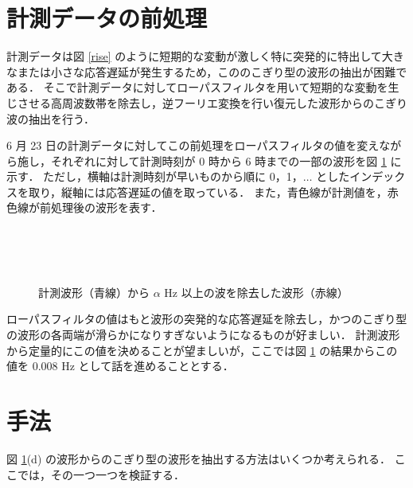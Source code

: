 \documentclass[a4j]{jarticle}
\begin{document}
\section{計測データの前処理}
計測データは図 \ref{rise} のように短期的な変動が激しく特に突発的に特出して大きなまたは小さな応答遅延が発生するため，こののこぎり型の波形の抽出が困難である．
そこで計測データに対してローパスフィルタを用いて短期的な変動を生じさせる高周波数帯を除去し，逆フーリエ変換を行い復元した波形からのこぎり波の抽出を行う．

6 月 23 日の計測データに対してこの前処理をローパスフィルタの値を変えながら施し，それぞれに対して計測時刻が 0 時から 6 時までの一部の波形を図 \ref{lowpass} に示す．
ただし，横軸は計測時刻が早いものから順に 0，1，$\ldots$ としたインデックスを取り，縦軸には応答遅延の値を取っている．
また，青色線が計測値を，赤色線が前処理後の波形を表す．
\begin{figure}[tb]
\begin{center}
~
\\
~
\\
~
\\
\caption{計測波形（青線）から $\alpha$ Hz 以上の波を除去した波形（赤線）}
\label{lowpass}
\end{center}
\end{figure}
ローパスフィルタの値はもと波形の突発的な応答遅延を除去し，かつのこぎり型の波形の各両端が滑らかになりすぎないようになるものが好ましい．
計測波形から定量的にこの値を決めることが望ましいが，ここでは図 \ref{lowpass} の結果からこの値を 0.008 Hz として話を進めることとする．

\section{手法}
図 \ref{lowpass}(d) の波形からのこぎり型の波形を抽出する方法はいくつか考えられる．
ここでは，その一つ一つを検証する．
\end{document}
